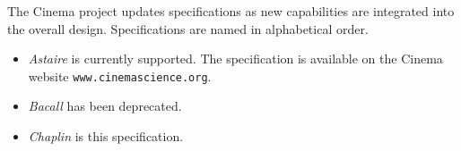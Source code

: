 The Cinema project updates specifications as new capabilities are integrated into the overall design. Specifications are named in alphabetical order.

\begin{itemize}
\item \textit{Astaire} is currently supported. The specification is available on the Cinema website \texttt{\small www.cinemascience.org}.
\item \textit{Bacall} has been deprecated. 
\item \textit{Chaplin} is this specification.
\end{itemize}
